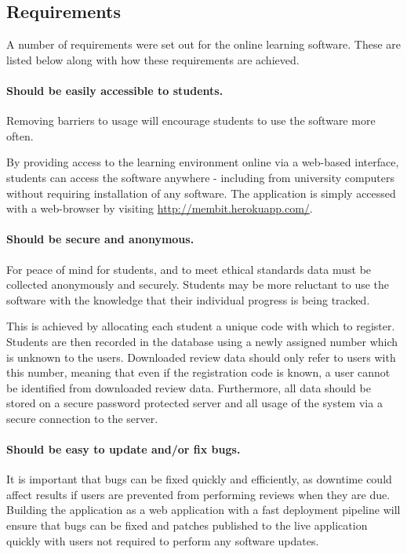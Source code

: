 \subsection{Requirements}

A number of requirements were set out for the online learning software. These are listed below along
with how these requirements are achieved.

\paragraph{Should be easily accessible to students.} Removing barriers to usage will
encourage students to use the software more often.

By providing access to the learning environment online via a web-based interface, students can
access the software anywhere - including from university computers without requiring installation
of any software. The application is simply accessed with a web-browser by visiting
\url{http://membit.herokuapp.com/}.

\paragraph{Should be secure and anonymous.} For peace of mind for students, and to meet
ethical standards data must be collected anonymously and securely. Students may be more
reluctant to use the software with the knowledge that their individual progress is being tracked.

This is achieved by allocating each student a unique code with which to register. Students are then
recorded in the database using a newly assigned number which is unknown to the users. Downloaded review
data should only refer to users with this number, meaning that even if the registration code is known,
a user cannot be identified from downloaded review data. Furthermore, all data should be stored on a secure
password protected server and all usage of the system via a secure connection to the server.

\paragraph{Should be easy to update and/or fix bugs.} It is important that bugs can be fixed quickly
and efficiently, as downtime could affect results if users are prevented from performing reviews
when they are due. Building the application as a web application with a fast deployment pipeline
will ensure that bugs can be fixed and patches published to the live application quickly with users
not required to perform any software updates. 

